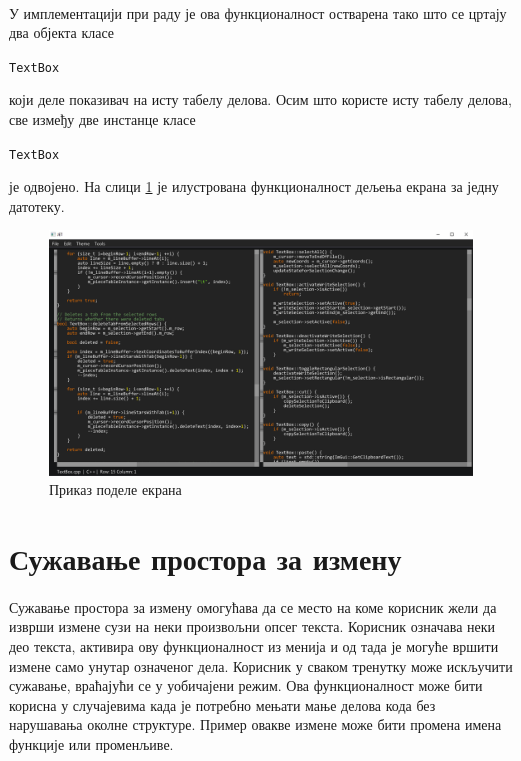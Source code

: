 \documentclass[12pt,oneside]{memoir}
\begin{document}
\paragraph{}
У имплементацији при раду је ова функционалност остварена тако што
се цртају два објекта класе \begin{latinica}\verb|TextBox|\end{latinica}
који деле показивач на исту табелу делова. Осим што користе исту табелу
делова, све између две инстанце класе \begin{latinica}\verb|TextBox|\end{latinica}  је одвојено.
На слици \ref{fig:split_screen} је илустрована функционалност дељења екрана
за једну датотеку.

\begin{figure}[!ht]
	\centering
	\includegraphics[width=1.0\textwidth]{images/split_screen.png}
	\caption{Приказ поделе екрана}
	\label{fig:split_screen}
\end{figure}


\section{Сужавање простора за измену}

\paragraph{}
Сужавање простора за измену омогућава да се место на коме корисник жели да изврши
измене сузи на неки произвољни опсег текста. Корисник означава неки део текста,
активира ову функционалност из менија и од тада је могуће вршити измене само
унутар означеног дела. Корисник у сваком тренутку може искључити сужавање, враћајући се у уобичајени режим. Ова функционалност може бити корисна у
случајевима када је потребно мењати мање делова кода без нарушавања околне
структуре. Пример овакве измене може бити промена имена функције или променљиве.
\end{document}
